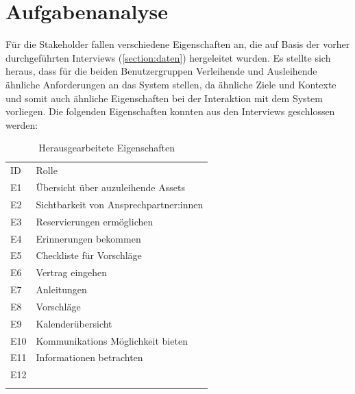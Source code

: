 
\section{Aufgabenanalyse}
\label{section:aufgaben}

Für die Stakeholder fallen verschiedene Eigenschaften an, die auf Basis der vorher durchgeführten
Interviews (\ref{section:daten}) hergeleitet wurden. Es stellte sich heraus, dass für die beiden
Benutzergruppen \glqq Verleihende\grqq{} und \glqq Ausleihende\grqq{} ähnliche Anforderungen an das
System stellen, da ähnliche Ziele und Kontexte und somit auch ähnliche Eigenschaften bei der
Interaktion mit dem System vorliegen. Die folgenden Eigenschaften konnten aus den Interviews
geschlossen werden:

\begin{table}[h]
        \centering
        \caption{Herausgearbeitete Eigenschaften}
        \begin{tabular}{ll}
                \arrayrulecolor{maincolor}\hline
                \sffamily\color{maincolor}ID & \sffamily\color{maincolor}Rolle \\
                \arrayrulecolor{maincolor}\hline
                E1                           & Übersicht über auzuleihende Assets \\
                E2                           & Sichtbarkeit von Ansprechpartner:innen \\
                E3                           & Reservierungen ermöglichen        \\
                E4                           & Erinnerungen bekommen             \\
                E5                           & Checkliste für Vorschläge         \\
                E6                           & Vertrag eingehen                  \\
                E7                           & Anleitungen                       \\
                E8                           & Vorschläge                        \\
                E9                           & Kalenderübersicht                 \\
                E10                          & Kommunikations Möglichkeit bieten \\
                E11                          & Informationen betrachten          \\
                E12                          &                                   \\
                \arrayrulecolor{maincolor}\hline
        \end{tabular}
        \label{table:e}
        \hfill
\end{table}




